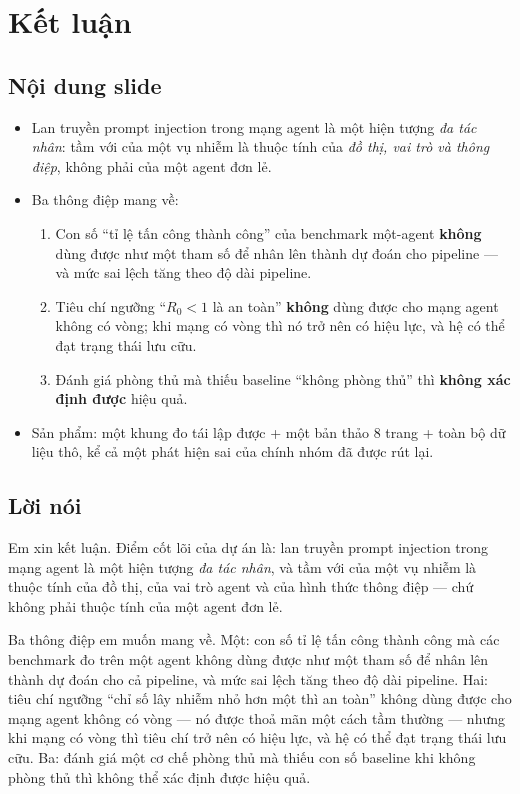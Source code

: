 \documentclass[11pt,a4paper]{article}
\newcommand{\slide}[1]{\section{#1}}
\newcommand{\noidung}{\subsection*{Nội dung slide}}
\newcommand{\loinoi}{\subsection*{Lời nói}}
\begin{document}
\slide{Kết luận}

\noidung
\begin{itemize}
  \item Lan truyền prompt injection trong mạng agent là một hiện tượng \emph{đa tác
        nhân}: tầm với của một vụ nhiễm là thuộc tính của \emph{đồ thị, vai trò và
        thông điệp}, không phải của một agent đơn lẻ.
  \item Ba thông điệp mang về:
        \begin{enumerate}
          \item Con số ``tỉ lệ tấn công thành công'' của benchmark một-agent
                \textbf{không} dùng được như một tham số để nhân lên thành dự đoán cho
                pipeline --- và mức sai lệch tăng theo độ dài pipeline.
          \item Tiêu chí ngưỡng ``$R_0 < 1$ là an toàn'' \textbf{không} dùng được cho
                mạng agent không có vòng; khi mạng có vòng thì nó trở nên có hiệu lực,
                và hệ có thể đạt trạng thái lưu cữu.
          \item Đánh giá phòng thủ mà thiếu baseline ``không phòng thủ'' thì
                \textbf{không xác định được} hiệu quả.
        \end{enumerate}
  \item Sản phẩm: một khung đo tái lập được + một bản thảo 8 trang + toàn bộ dữ liệu thô,
        kể cả một phát hiện sai của chính nhóm đã được rút lại.
\end{itemize}

\loinoi
Em xin kết luận. Điểm cốt lõi của dự án là: lan truyền prompt injection trong mạng agent
là một hiện tượng \emph{đa tác nhân}, và tầm với của một vụ nhiễm là thuộc tính của đồ
thị, của vai trò agent và của hình thức thông điệp --- chứ không phải thuộc tính của một
agent đơn lẻ.

Ba thông điệp em muốn mang về. Một: con số tỉ lệ tấn công thành công mà các benchmark
đo trên một agent không dùng được như một tham số để nhân lên thành dự đoán cho cả
pipeline, và mức sai lệch tăng theo độ dài pipeline. Hai: tiêu chí ngưỡng ``chỉ số lây
nhiễm nhỏ hơn một thì an toàn'' không dùng được cho mạng agent không có vòng --- nó
được thoả mãn một cách tầm thường --- nhưng khi mạng có vòng thì tiêu chí trở nên có
hiệu lực, và hệ có thể đạt trạng thái lưu cữu. Ba: đánh giá một cơ chế phòng thủ mà
thiếu con số baseline khi không phòng thủ thì không thể xác định được hiệu quả.
\end{document}
